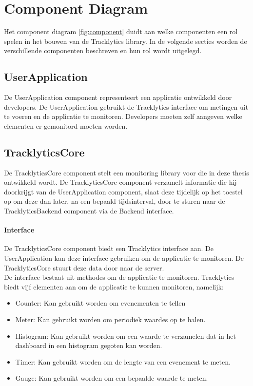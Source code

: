 \section{Component Diagram}
Het component diagram \ref{fig:component} duidt aan welke componenten een rol spelen in het bouwen van de Tracklytics library. In de volgende secties worden de verschillende componenten beschreven en hun rol wordt uitgelegd.





\subsection{UserApplication}
De UserApplication component representeert een applicatie ontwikkeld door developers. De UserApplication gebruikt de Tracklytics interface om metingen uit te voeren en de applicatie te monitoren. Developers moeten zelf aangeven welke elementen er gemonitord moeten worden. 


\subsection{TracklyticsCore}
De TracklyticsCore component stelt een monitoring library voor die in deze thesis ontwikkeld wordt. De TracklyticsCore component verzamelt informatie die hij doorkrijgt van de UserApplication component, slaat deze tijdelijk op het toestel op om deze dan later, na een bepaald tijdsinterval, door te sturen naar de TracklyticsBackend component via de Backend interface.  \\

\paragraph{Interface}
De TracklyticsCore component biedt een Tracklytics interface aan. De UserApplication kan deze interface gebruiken om de applicatie te monitoren. De TracklyticsCore stuurt deze data door naar de server.\\

De interface bestaat uit methodes om de applicatie te monitoren. Tracklytics biedt vijf elementen aan om de applicatie te kunnen monitoren, namelijk:
\begin{itemize}
\item Counter: Kan gebruikt worden om evenementen te tellen
\item Meter: Kan gebruikt worden om periodiek waardes op te halen.
\item Histogram: Kan gebruikt worden om een waarde te verzamelen dat in het dashboard in een histogram gegoten kan worden. 
\item Timer: Kan gebruikt worden om de lengte van een evenement te meten.
\item Gauge: Kan gebruikt worden om een bepaalde waarde te meten. 
\end{itemize}

